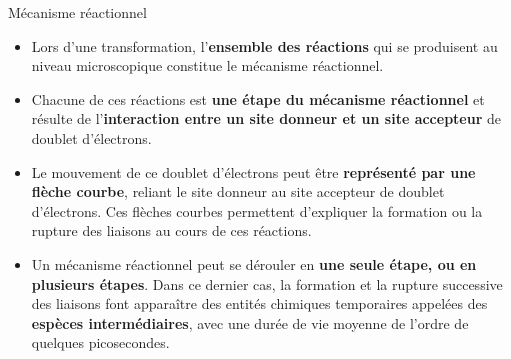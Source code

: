 \documentclass[11pt,a4paper]{article}
\begin{document}
\begin{defn}{Mécanisme réactionnel}
\begin{itemize}
    \item Lors d’une transformation, l’\textbf{ensemble des réactions} qui se produisent au niveau microscopique constitue le mécanisme réactionnel.
    \item Chacune de ces réactions est \textbf{une étape du mécanisme réactionnel} et résulte de l’\textbf{interaction entre un site donneur et un site accepteur} de doublet d’électrons. 
    \item Le mouvement de ce doublet d’électrons peut être \textbf{représenté par une flèche courbe}, reliant le site donneur au site accepteur de doublet d’électrons. Ces flèches courbes permettent d’expliquer la formation ou la rupture des liaisons au cours de ces réactions. 
    \item Un mécanisme réactionnel peut se dérouler en \textbf{une seule étape, ou en plusieurs étapes}. Dans ce dernier cas, la formation et la rupture successive des liaisons font apparaître des entités chimiques temporaires appelées des \textbf{espèces intermédiaires}, avec une durée de vie moyenne de l’ordre de quelques picosecondes. 
\end{itemize}
\end{defn}
\end{document}
